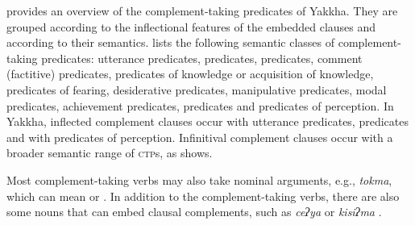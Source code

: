  provides an overview of the complement-taking predicates of Yakkha. They are grouped according to the  inflectional features of the embedded clauses and according to their semantics.  \citet[120]{Noonan2007Complementation} lists the following semantic classes of complement-taking predicates: utterance predicates,  predicates,  predicates, comment (factitive) predicates, predicates of knowledge or acquisition of knowledge, predicates of fearing, desiderative  predicates, manipulative predicates, modal predicates, achievement predicates,  predicates and predicates of perception. In Yakkha, inflected complement clauses occur with utterance predicates,  predicates and  with predicates of perception. Infinitival  complement clauses occur with a broader semantic range of \textsc{ctp}s, as  shows. 

Most complement-taking verbs may also take nominal arguments, e.g., \emph{tokma}, which can mean  or . In addition to the complement-taking verbs, there are also some nouns that can embed clausal complements, such as \emph{ceʔya}  or \emph{kisiʔma} . 


